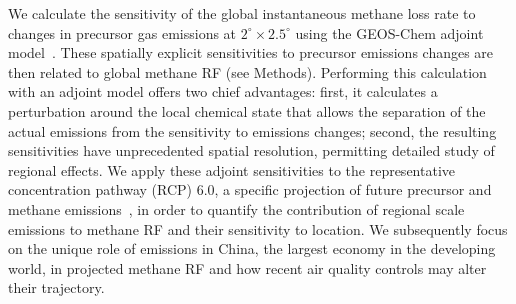 
We calculate the sensitivity of the global instantaneous methane loss rate to changes in precursor gas emissions at $2^{\circ}\times 2.5^{\circ}$ using the GEOS-Chem adjoint model~\citep{ref:henze2007}. These spatially explicit sensitivities to precursor emissions changes are then related to global methane RF (see Methods). Performing this calculation with an adjoint model offers two chief advantages: first, it calculates a perturbation around the local chemical state that allows the separation of the actual emissions from the sensitivity to emissions changes; second, the resulting sensitivities have unprecedented spatial resolution, permitting detailed study of regional effects. We apply these adjoint sensitivities to the representative concentration pathway (RCP) 6.0, a specific projection of future precursor and methane emissions~\citep{ref:vanvuuren2011}, in order to quantify the contribution of regional scale emissions to methane RF and their sensitivity to location. We subsequently focus on the unique role of emissions in China, the largest economy in the developing world, in projected methane RF and how recent air quality controls may alter their trajectory.
